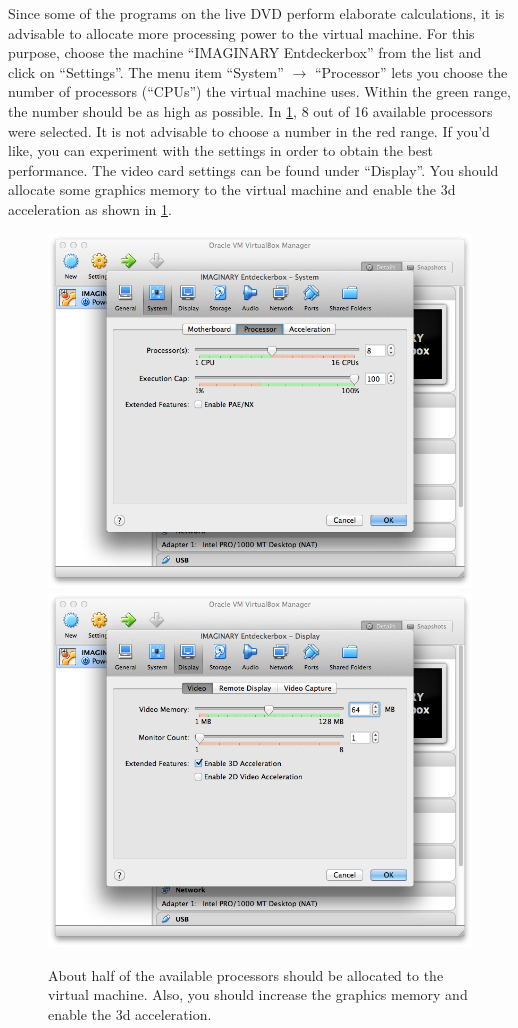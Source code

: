 \documentclass[a4paper,10pt,BCOR=0mm,DIV=14]{scrartcl}
\def\gfxscale{0.27}
\newcommand{\command}[1]{\textsf{\enquote{#1}}}
\begin{document}
Since some of the programs on the live DVD perform elaborate calculations, it is advisable to allocate more processing power to the virtual machine. For this purpose, choose the machine \command{IMAGINARY Entdeckerbox} from the list and click on \command{Settings}. The menu item \command{System} $\rightarrow$ \command{Processor} lets you choose the number of processors (\command{CPUs}) the virtual machine uses. Within the green range, the number should be as high as possible. In \cref{VBox60}, 8 out of 16 available processors were selected. It is not advisable to choose a number in the red range. If you'd like, you can experiment with the settings in order to obtain the best performance. The video card settings can be found under \command{Display}. You should allocate some graphics memory to the virtual machine and enable the 3d acceleration as shown in \cref{VBox60}. 
\begin{figure}[h]
\centering\includegraphics[scale=\gfxscale]{VBox60_en_GB}
\qquad\includegraphics[scale=\gfxscale]{VBox61_en_GB}
\caption{About half of the available processors should be allocated to the virtual machine. Also, you should increase the graphics memory and enable the 3d acceleration.}
\label{VBox60}
\end{figure}
\end{document}
